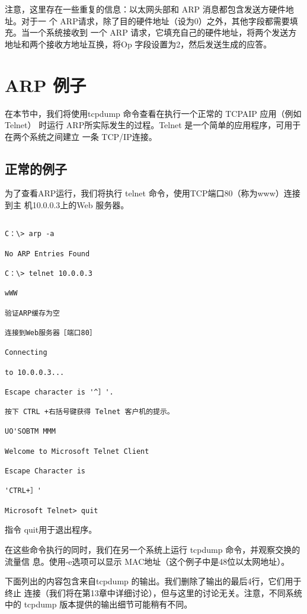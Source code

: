 注意，这里存在一些重复的信息：以太网头部和 ARP 消息都包含发送方硬件地址。对于一
个 ARP请求，除了目的硬件地址（设为0）之外，其他字段都需要填充。当一个系统接收到
一个 ARP 请求，它填充自己的硬件地址，将两个发送方地址和两个接收方地址互换，将Op
字段设置为2，然后发送生成的应答。

\section{ARP 例子}

在本节中，我们将使用tcpdump 命令查看在执行一个正常的 TCPAIP 应用（例如 Telnet）
时运行 ARP所实际发生的过程。Telnet 是一个简单的应用程序，可用于在两个系统之间建立
一条 TCP/IP连接。

\subsection{正常的例子}

为了查看ARP运行，我们将执行 telnet 命令，使用TCP端口80（称为www）连接到主
机10.0.0.3上的Web 服务器。

\begin{verbatim}
    
C：\> arp -a

No ARP Entries Found

C：\> telnet 10.0.0.3

wWW

验证ARP缓存为空

连接到Web服务器［端口80］

Connecting

to 10.0.0.3...

Escape character is '^］'.

按下 CTRL +右括号键获得 Telnet 客户机的提示。

UO'SOBTM MMM

Welcome to Microsoft Telnet Client

Escape Character is

'CTRL+］'

Microsoft Telnet> quit
\end{verbatim}

指令 quit用于退出程序。

在这些命令执行的同时，我们在另一个系统上运行 tcpdump 命令，并观察交换的流量信
息。使用-e选项可以显示 MAC地址（这个例子中是48位以太网地址）。

下面列出的内容包含来自tcpdump 的输出。我们删除了输出的最后4行，它们用于终止
连接（我们将在第13章中详细讨论），但与这里的讨论无关。注意，不同系统中的 tcpdump
版本提供的输出细节可能稍有不同。

